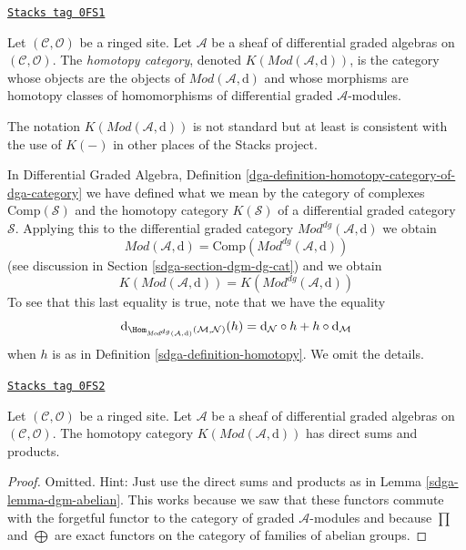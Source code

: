 \begin{definition}
\label{sdga-definition-complexes-notation}
\href{https://stacks.math.columbia.edu/tag/0FS1}{\texttt{Stacks tag 0FS1}}

Let $(\mathcal{C}, \mathcal{O})$ be a ringed site.
Let $\mathcal{A}$ be a sheaf of differential graded algebras
on $(\mathcal{C}, \mathcal{O})$.
The {\it homotopy category}, denoted $K(\textit{Mod}(\mathcal{A}, \text{d}))$,
is the category whose objects are the objects of
$\textit{Mod}(\mathcal{A}, \text{d})$ and whose morphisms are homotopy classes
of homomorphisms of differential graded $\mathcal{A}$-modules.
\end{definition}

The notation $K(\textit{Mod}(\mathcal{A}, \text{d}))$
is not standard but at least is
consistent with the use of $K(-)$ in other places of the Stacks project.

\medskip\noindent
In Differential Graded Algebra, Definition
\ref{dga-definition-homotopy-category-of-dga-category}
we have defined what we mean by the category of complexes
$\text{Comp}(\mathcal{S})$
and the homotopy category $K(\mathcal{S})$
of a differential graded category $\mathcal{S}$.
Applying this to the differential graded category
$\textit{Mod}^{dg}(\mathcal{A}, \text{d})$ we obtain
$$
\textit{Mod}(\mathcal{A}, \text{d}) =
\text{Comp}(\textit{Mod}^{dg}(\mathcal{A}, \text{d}))
$$
(see discussion in Section \ref{sdga-section-dgm-dg-cat}) and we obtain
$$
K(\textit{Mod}(\mathcal{A}, \text{d})) =
K(\textit{Mod}^{dg}(\mathcal{A}, \text{d}))
$$
To see that this last equality is true, note that we have the equality
$$
\text{d}_{\Hom_{\textit{Mod}^{dg}(\mathcal{A}, \text{d})}
(\mathcal{M}, \mathcal{N})}(h) =
\text{d}_\mathcal{N} \circ h + h \circ \text{d}_\mathcal{M}
$$
when $h$ is as in Definition \ref{sdga-definition-homotopy}. We omit the
details.

\begin{lemma}
\label{sdga-lemma-homotopy-direct-sums}
\href{https://stacks.math.columbia.edu/tag/0FS2}{\texttt{Stacks tag 0FS2}}

Let $(\mathcal{C}, \mathcal{O})$ be a ringed site.
Let $\mathcal{A}$ be a sheaf of differential graded algebras
on $(\mathcal{C}, \mathcal{O})$.
The homotopy category $K(\textit{Mod}(\mathcal{A}, \text{d}))$
has direct sums and products.
\end{lemma}

\begin{proof}

Omitted. Hint: Just use the direct sums and products as in
Lemma \ref{sdga-lemma-dgm-abelian}. This works because we saw that
these functors commute with the forgetful functor to the category
of graded $\mathcal{A}$-modules and because $\prod$ and $\bigoplus$
are exact functors on the category of families of abelian groups.
\end{proof}

